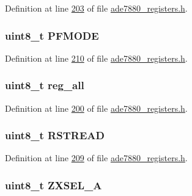 Definition at line \hyperlink{a00036_source_l00203}{203} of file \hyperlink{a00036_source}{ade7880\-\_\-registers.\-h}.

\hypertarget{a00026_af9fed4395e32a1102c342a431884f799}{
\subsubsection[{P\-F\-M\-O\-D\-E}]{\setlength{\rightskip}{0pt plus 5cm}uint8\-\_\-t P\-F\-M\-O\-D\-E}}\label{d6/d5b/a00026_af9fed4395e32a1102c342a431884f799}


Definition at line \hyperlink{a00036_source_l00210}{210} of file \hyperlink{a00036_source}{ade7880\-\_\-registers.\-h}.

\hypertarget{a00026_ab2957613fa7f241407cc98e80676dccf}{
\subsubsection[{reg\-\_\-all}]{\setlength{\rightskip}{0pt plus 5cm}uint8\-\_\-t reg\-\_\-all}}\label{d6/d5b/a00026_ab2957613fa7f241407cc98e80676dccf}


Definition at line \hyperlink{a00036_source_l00200}{200} of file \hyperlink{a00036_source}{ade7880\-\_\-registers.\-h}.

\hypertarget{a00026_aafaa346df324b01a075cd375da912a54}{
\subsubsection[{R\-S\-T\-R\-E\-A\-D}]{\setlength{\rightskip}{0pt plus 5cm}uint8\-\_\-t R\-S\-T\-R\-E\-A\-D}}\label{d6/d5b/a00026_aafaa346df324b01a075cd375da912a54}


Definition at line \hyperlink{a00036_source_l00209}{209} of file \hyperlink{a00036_source}{ade7880\-\_\-registers.\-h}.

\hypertarget{a00026_a068f0a364de8fa56faa732c081d0d063}{
\subsubsection[{Z\-X\-S\-E\-L\-\_\-\-A}]{\setlength{\rightskip}{0pt plus 5cm}uint8\-\_\-t Z\-X\-S\-E\-L\-\_\-\-A}}\label{d6/d5b/a00026_a068f0a364de8fa56faa732c081d0d063}


